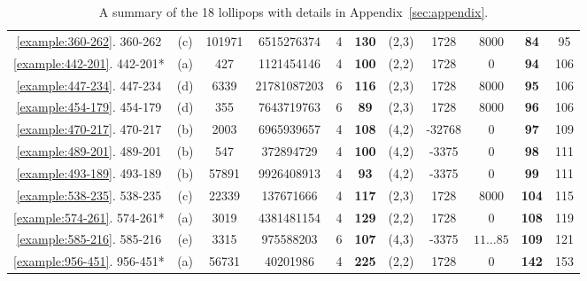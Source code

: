 \documentclass[version=preprint]{iacrcc}
\begin{document}
\begin{table}[ht!]
\begin{tabular}{|c|c|c|c|c|c|c|c|c|c|c|}
\ref{example:360-262}. \textsf{360-262}	&	(c)	&	101971	&6515276374  &	4	&	{\bf 130}	&	(2,3)	&	1728	& 8000						  &	{\bf 84} &	95	\\
\ref{example:442-201}. \textsf{442-201}*	&	(a)	&	427		&1121454146 &	4	&	{\bf 100}	&	(2,2)	&	1728	&  0		&	{\bf 94} &	106	\\
\ref{example:447-234}. \textsf{447-234}	&	(d)	&	6339	&	21781087203 &	6	&	{\bf 116}	&	(2,3)	&	1728	&	8000 &	{\bf 95} &	106	\\
\ref{example:454-179}. \textsf{454-179}	&	(d)	&	355	&	7643719763 &	6	&	{\bf 89}	&	(2,3)	&	1728	&	8000 &	{\bf 96}&	106	\\
\ref{example:470-217}. \textsf{470-217}	&	(b)	&	2003	&	6965939657 &	4	&	{\bf 108 }	&	(4,2)	&	-32768	& 0	&	{\bf 97} &	109	\\
\ref{example:489-201}. \textsf{489-201}	&	(b)	&	547	&	372894729 &	4	&	{\bf 100}	&	(4,2)	&	-3375		&0 	& {\bf 98}	&	111	\\
\ref{example:493-189}. \textsf{493-189}	&	(b)	&	57891&	9926408913&	4	&	{\bf 93}	&	(4,2)	&	-3375		&0 	& {\bf 99}	&	111	\\
\ref{example:538-235}. \textsf{538-235}	&	(c)	&	22339&	137671666&	4	&	{\bf 117}	&	(2,3)	&	1728		& 8000	&	{\bf 104} &	115	\\
\ref{example:574-261}. \textsf{574-261}*	&	(a)	&	3019	&	4381481154&	4	&	{\bf 129}	&	(2,2)	&	1728		& 0	&	{\bf 108} &	119	\\
\ref{example:585-216}. \textsf{585-216}	&	(e)	&	3315	&	975588203 &	6	&	{\bf 107}	&	(4,3)	&	-3375	& $11\dots 85$	&	{\bf 109} &	121	\\
\ref{example:956-451}. \textsf{956-451}*	&	(a)	&	56731&	40201986 	&	4	&	{\bf 225}	&	(2,2)	&	1728	&	0			&	{\bf 142} &	153	\\
\hline
	\end{tabular}\vspace{0.3cm}
\caption{A summary of the 18 lollipops with details in Appendix~\ref{sec:appendix}.}
	\label{tab:examples}
\end{table}
\end{document}
